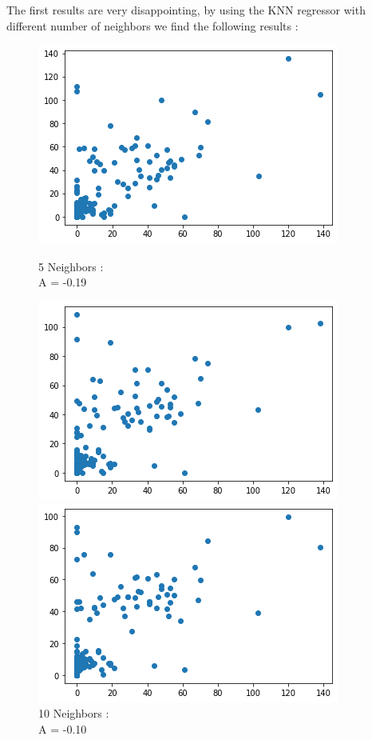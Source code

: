 \documentclass{report}
\begin{document}
The first results are very disappointing, by using the KNN regressor with different number of neighbors we find the following results :


\begin{figure}[!htb]
  \includegraphics[width=\linewidth]{KNN5Nei.png}
  \caption{5 Neighbors : \\A = -0.19}\label{fig:KNN5Nei}
\endminipage\hfill
{}
  \includegraphics[width=\linewidth]{KNN10Nei.png}
  \caption{10 Neighbors : \\A = -0.10}\label{fig:KNN10Nei}
\endminipage\hfill
{}%
  \includegraphics[width=\linewidth]{KNN20Nei.png}

\end{figure}
\end{document}
